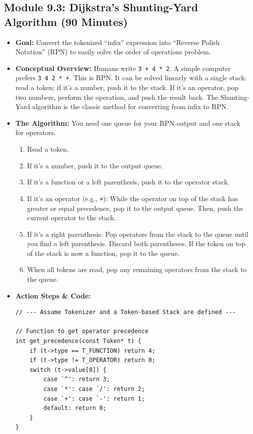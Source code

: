 \documentclass[11pt,a4paper]{article}
\begin{document}
\subsection*{Module 9.3: Dijkstra's Shunting-Yard Algorithm (90 Minutes)}

\begin{itemize}
    \item \textbf{Goal:} Convert the tokenized ``infix'' expression into ``Reverse Polish Notation'' (RPN) to easily solve the order of operations problem.
    \item \textbf{Conceptual Overview:} Humans write \verb|3 + 4 * 2|. A simple computer prefers \verb|3 4 2 * +|. This is RPN. It can be solved linearly with a single stack: read a token; if it's a number, push it to the stack. If it's an operator, pop two numbers, perform the operation, and push the result back. The Shunting-Yard algorithm is the classic method for converting from infix to RPN.
    \item \textbf{The Algorithm:} You need one queue for your RPN output and one stack for operators.
    \begin{enumerate}
        \item Read a token.
        \item If it's a number, push it to the output queue.
        \item If it's a function or a left parenthesis, push it to the operator stack.
        \item If it's an operator (e.g., \verb|+|): While the operator on top of the stack has greater or equal precedence, pop it to the output queue. Then, push the current operator to the stack.
        \item If it's a right parenthesis: Pop operators from the stack to the queue until you find a left parenthesis. Discard both parentheses. If the token on top of the stack is now a function, pop it to the queue.
        \item When all tokens are read, pop any remaining operators from the stack to the queue.
    \end{enumerate}
    \item \textbf{Action Steps \& Code:}
\begin{lstlisting}[caption={Code for Module 9.3: Shunting-Yard Implementation}]
// --- Assume Tokenizer and a Token-based Stack are defined ---

// Function to get operator precedence
int get_precedence(const Token* t) {
    if (t->type == T_FUNCTION) return 4;
    if (t->type != T_OPERATOR) return 0;
    switch (t->value[0]) {
        case `^': return 3;
        case `*': case `/': return 2;
        case `+': case `-': return 1;
        default: return 0;
    }
}


\end{lstlisting}
\end{itemize}
\end{document}
